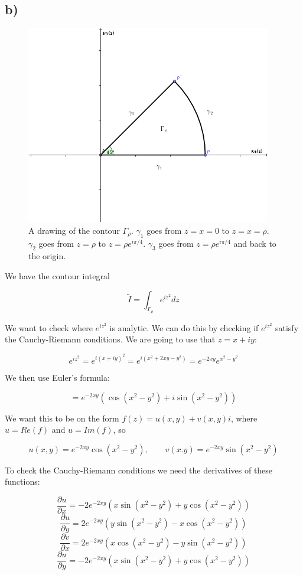 \documentclass[a4paper,norsk, 10pt]{article}
\begin{document}
\subsection*{b)}
\begin{figure}[H]
\centering
\includegraphics[scale=0.8]{2b.png}
\caption{A drawing of the contour $\Gamma_{\rho}$. $\gamma_1$ goes from $z = x=0$ to $z = x = \rho$. $\gamma_2$ goes from $z = \rho$ to $z = \rho e^{i\pi/4}$. $\gamma_3$ goes from $z = \rho e^{i\pi/4}$ and back to the origin.}
\end{figure}

We have the contour integral

$$
\tilde{I} = \int_{\Gamma_{\rho}} e^{iz^2}dz
$$

We want to check where $e^{iz^2}$ is analytic. We can do this by checking if $e^{iz^2}$ satisfy the Cauchy-Riemann conditions. We are going to use that $z = x+iy$:

$$
e^{iz^2} = e^{i(x + iy)^2} = e^{i(x^2 + 2xy -y^2)} = e^{-2xy}e^{x^2-y^2}
$$

We then use Euler's formula:

$$
= e^{-2xy}(\cos(x^2-y^2) + i\sin(x^2-y^2))
$$

We want this to be on the form $f(z) = u(x,y) + v(x,y)i$, where $u = Re(f)$ and $u = Im(f)$, so

$$
u(x,y) = e^{-2xy}\cos(x^2-y^2), \qquad v(x.y) = e^{-2xy}\sin(x^2-y^2)
$$

To check the Cauchy-Riemann conditions we need the derivatives of these functions:

$$
\frac{\partial u}{\partial x} = -2e^{-2xy}(x\sin(x^2-y^2) + y\cos(x^2 - y^2))
$$
$$
\frac{\partial u}{\partial y} = 2e^{-2xy}(y\sin(x^2-y^2) - x\cos(x^2 - y^2))
$$
$$
\frac{\partial v}{\partial x} = 2e^{-2xy}(x\cos(x^2-y^2) - y\sin(x^2 - y^2))
$$
$$
\frac{\partial u}{\partial y} = -2e^{-2xy}(x\sin(x^2-y^2) + y\cos(x^2 - y^2))
$$
\end{document}
